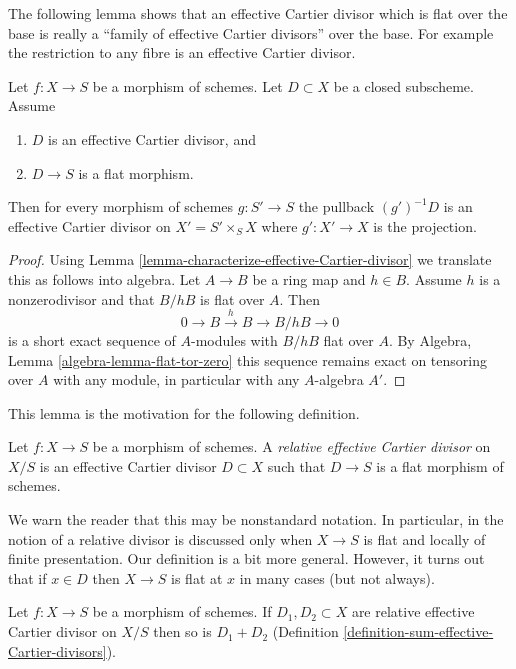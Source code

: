\noindent
The following lemma shows that an effective Cartier divisor which is
flat over the base is really a ``family of effective Cartier divisors''
over the base. For example the restriction to any fibre is an effective
Cartier divisor.

\begin{lemma}
\label{lemma-relative-Cartier}
Let $f : X \to S$ be a morphism of schemes.
Let $D \subset X$ be a closed subscheme.
Assume
\begin{enumerate}
\item $D$ is an effective Cartier divisor, and
\item $D \to S$ is a flat morphism.
\end{enumerate}
Then for every morphism of schemes $g : S' \to S$ the pullback
$(g')^{-1}D$ is an effective Cartier divisor on $X' = S' \times_S X$
where $g' : X' \to X$ is the projection.
\end{lemma}

\begin{proof}
Using
Lemma \ref{lemma-characterize-effective-Cartier-divisor}
we translate this as follows into algebra. Let $A \to B$ be a ring
map and $h \in B$. Assume $h$ is a nonzerodivisor and that $B/hB$ is flat
over $A$. Then
$$
0 \to B \xrightarrow{h} B \to B/hB \to 0
$$
is a short exact sequence of $A$-modules with $B/hB$ flat over $A$. By
Algebra, Lemma \ref{algebra-lemma-flat-tor-zero}
this sequence remains exact on tensoring over $A$ with any module, in
particular with any $A$-algebra $A'$.
\end{proof}

\noindent
This lemma is the motivation for the following definition.

\begin{definition}
\label{definition-relative-effective-Cartier-divisor}
Let $f : X \to S$ be a morphism of schemes.
A {\it relative effective Cartier divisor} on $X/S$ is an
effective Cartier divisor $D \subset X$ such that $D \to S$
is a flat morphism of schemes.
\end{definition}

\noindent
We warn the reader that this may be nonstandard notation.
In particular, in \cite[IV, Section 21.15]{EGA} the notion of a
relative divisor is discussed only when $X \to S$ is flat and
locally of finite presentation. Our definition is a bit more general.
However, it turns out that if $x \in D$ then $X \to S$ is
flat at $x$ in many cases (but not always).

\begin{lemma}
\label{lemma-sum-relative-effective-Cartier-divisor}
Let $f : X \to S$ be a morphism of schemes. If $D_1, D_2 \subset X$
are relative effective Cartier divisor on $X/S$ then so
is $D_1 + D_2$ (Definition \ref{definition-sum-effective-Cartier-divisors}).
\end{lemma}

